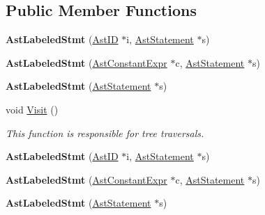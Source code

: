 \subsection*{Public Member Functions}
\begin{DoxyCompactItemize}
\item 
\hypertarget{classAstLabeledStmt_aca812c738648cde75efb63b54ea4083d}{{\bfseries Ast\-Labeled\-Stmt} (\hyperlink{classAstID}{Ast\-I\-D} $\ast$i, \hyperlink{classAstStatement}{Ast\-Statement} $\ast$s)}\label{classAstLabeledStmt_aca812c738648cde75efb63b54ea4083d}

\item 
\hypertarget{classAstLabeledStmt_a49285a53627a00f502fa04afb2a72d47}{{\bfseries Ast\-Labeled\-Stmt} (\hyperlink{classAstConstantExpr}{Ast\-Constant\-Expr} $\ast$c, \hyperlink{classAstStatement}{Ast\-Statement} $\ast$s)}\label{classAstLabeledStmt_a49285a53627a00f502fa04afb2a72d47}

\item 
\hypertarget{classAstLabeledStmt_a545ffe76c4ebdc254a554f655b1d19e4}{{\bfseries Ast\-Labeled\-Stmt} (\hyperlink{classAstStatement}{Ast\-Statement} $\ast$s)}\label{classAstLabeledStmt_a545ffe76c4ebdc254a554f655b1d19e4}

\item 
void \hyperlink{classAstLabeledStmt_a2477cd4279ec466452407604e0897261}{Visit} ()
\begin{DoxyCompactList}\small\item\em This function is responsible for tree traversals. \end{DoxyCompactList}\item 
\hypertarget{classAstLabeledStmt_aca812c738648cde75efb63b54ea4083d}{{\bfseries Ast\-Labeled\-Stmt} (\hyperlink{classAstID}{Ast\-I\-D} $\ast$i, \hyperlink{classAstStatement}{Ast\-Statement} $\ast$s)}\label{classAstLabeledStmt_aca812c738648cde75efb63b54ea4083d}

\item 
\hypertarget{classAstLabeledStmt_a49285a53627a00f502fa04afb2a72d47}{{\bfseries Ast\-Labeled\-Stmt} (\hyperlink{classAstConstantExpr}{Ast\-Constant\-Expr} $\ast$c, \hyperlink{classAstStatement}{Ast\-Statement} $\ast$s)}\label{classAstLabeledStmt_a49285a53627a00f502fa04afb2a72d47}

\item 
\hypertarget{classAstLabeledStmt_a545ffe76c4ebdc254a554f655b1d19e4}{{\bfseries Ast\-Labeled\-Stmt} (\hyperlink{classAstStatement}{Ast\-Statement} $\ast$s)}\label{classAstLabeledStmt_a545ffe76c4ebdc254a554f655b1d19e4}


\end{DoxyCompactItemize}
